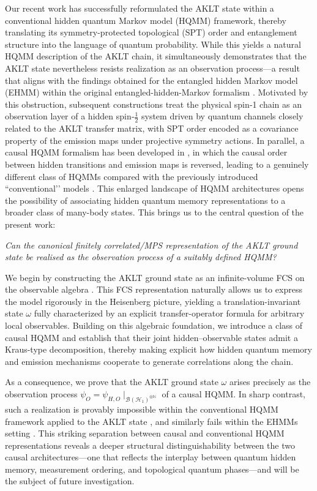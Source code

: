 \documentclass[11pt,a4paper]{article}
\begin{document}
Our recent work \cite{SA26} has successfully reformulated the AKLT state within a conventional hidden quantum Markov model (HQMM) framework, thereby translating its symmetry-protected topological (SPT) order and entanglement structure into the language of quantum probability. While this yields a natural HQMM description of the AKLT chain, it simultaneously demonstrates that the AKLT state nevertheless resists realization as an observation process—a result that aligns with the findings obtained for the entangled hidden Markov model (EHMM) \cite{Sou25} within the original entangled-hidden-Markov formalism \cite{SS23}. Motivated by this obstruction, subsequent constructions treat the physical spin‑1 chain as an observation layer of a hidden spin‑\( \tfrac{1}{2} \) system driven by quantum channels closely related to the AKLT transfer matrix, with SPT order encoded as a covariance property of the emission maps under projective symmetry actions. 
In parallel, a causal HQMM   formalism has been developed in \cite{SouBarhqmm2026}, in which the causal order between hidden transitions and emission maps is reversed, leading to a genuinely different class of HQMMs compared with the previously introduced “conventional’’ models \cite{AGLS24Q}. This enlarged landscape of HQMM architectures opens the possibility of associating hidden quantum memory representations to a broader class of many-body states. This brings us to the central question of the present work:
\medskip

\emph{Can the canonical finitely correlated/MPS representation of the AKLT ground state be realised as the observation process of a suitably defined HQMM?}


We begin by constructing the AKLT ground state as an infinite-volume  FCS  on the observable algebra  \cite{FNW92}. This FCS representation naturally allows us to express the model rigorously in the Heisenberg picture, yielding a translation-invariant state $\omega$ fully characterized by an explicit transfer-operator formula for arbitrary local observables. Building on this algebraic foundation, we introduce a class of causal HQMM and establish that their joint hidden–observable states admit a Kraus-type decomposition, thereby making explicit how hidden quantum memory and emission mechanisms cooperate to generate correlations along the chain.

As a consequence, we prove that the AKLT ground state $\omega$ arises precisely as the observation process $\psi_O = \psi_{H,O}\mid_{\mathcal{B}(\mathcal{H}_{1})^{\otimes \mathbb{N}}}$ of a causal HQMM. In sharp contrast, such a realization is provably impossible within the conventional HQMM framework applied to the AKLT state \cite{SA26}, and similarly fails within the EHMMs setting \cite{Sou25}.  This striking separation between causal and conventional HQMM representations reveals a deeper structural distinguishability between the two causal architectures—one that reflects the interplay between quantum hidden memory, measurement ordering, and topological quantum phases—and will be the subject of future investigation.
\end{document}
